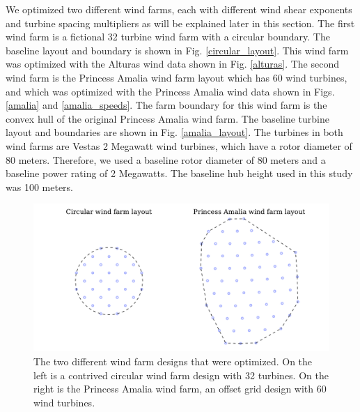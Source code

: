 We optimized two different wind farms, each with different wind shear exponents and turbine spacing multipliers as will be explained later in this section. 
The first wind farm is a fictional 32 turbine wind farm with a circular boundary. The baseline layout and boundary is shown in Fig. \ref{circular_layout}. This wind farm was optimized with the Alturas wind data shown in Fig. \ref{alturas}.  
The second wind farm is the Princess Amalia wind farm layout which has 60 wind turbines, and which was optimized with the Princess Amalia wind data shown in Figs. \ref{amalia} and \ref{amalia_speeds}. The farm boundary for this wind farm is the convex hull of the original Princess Amalia wind farm. The baseline turbine layout and boundaries are shown in Fig. \ref{amalia_layout}. The turbines in both wind farms are Vestas 2 Megawatt wind turbines, which have a rotor diameter of 80 meters. Therefore, we used a baseline rotor diameter of 80 meters and a baseline power rating of 2 Megawatts. The baseline hub height used in this study was 100 meters. 

\begin{figure}[htbp]
  \centering
   \includegraphics[width=\textwidth]{Figures/baseline_layouts.pdf}
  \caption{\label{layouts} The two different wind farm designs that were optimized. On the left is a contrived circular wind farm design with 32 turbines. On the right is the Princess Amalia wind farm, an offset grid design with 60 wind turbines. }
\end{figure}

